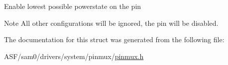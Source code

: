 Enable lowest possible powerstate on the pin

\begin{DoxyNote}{Note}
All other configurations will be ignored, the pin will be disabled. 
\end{DoxyNote}


The documentation for this struct was generated from the following file\+:\begin{DoxyCompactItemize}
\item 
A\+S\+F/sam0/drivers/system/pinmux/\mbox{\hyperlink{pinmux_8h}{pinmux.\+h}}\end{DoxyCompactItemize}
